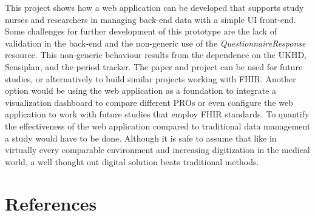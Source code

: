 \documentclass[
a4paper,
11pt
]{article}
\begin{document}
	This project shows how a web application can be developed that supports study nurses and researchers in managing back-end data with a simple \ac{UI} front-end. Some challenges for further development of this prototype are the lack of validation in the back-end and the non-generic use of the \textit{QuestionnaireResponse} resource. This non-generic behaviour results from the dependence on the \ac{UKHD}, Sensiplan\textsuperscript{\textcopyright}, and the period tracker. The paper and project can be used for future studies, or alternatively to build similar projects working with \ac{FHIR}. Another option would be using the web application as a foundation to integrate a visualization dashboard to compare different \acp{PRO} or even configure the web application to work with future studies that employ \ac{FHIR} standards. To quantify the effectiveness of the web application compared to traditional data management a study would have to be done. Although it is safe to assume that like in virtually every comparable environment and increasing digitization in the medical world, a well thought out digital solution beats traditional methods.
	
	\newpage
	
	

\section{References}
	\printbibliography
\end{document}
